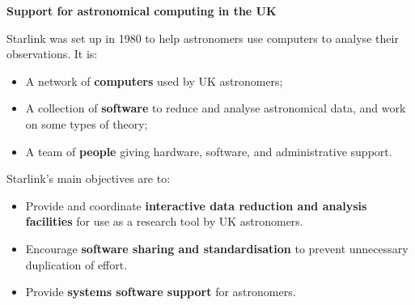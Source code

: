 \documentclass[twoside,11pt]{article}
\newenvironment{latexonly}{}{}
\newcommand{\html}[1]{}
\newcommand{\xlabel}[1]{}
\renewcommand{\thepage}{\roman{page}}
\begin{document}
\renewcommand{\thepage}{\arabic{page}}
\setcounter{page}{1}

\html{\section{\xlabel{support}Support for astronomical computing in
the UK}}
\begin{latexonly}
\begin{center}
{\large\bf Support for astronomical computing in the UK}
\end{center}
\end{latexonly}

\vspace*{5mm}
\html{\normalsize\rm}
Starlink was set up in 1980 to help astronomers use computers to analyse their
observations.
It is:

\begin{itemize}
\item A network of {\bf computers} used by UK astronomers;
\item A collection of {\bf software} to reduce and analyse astronomical data,
and work on some types of theory;
\item A team of {\bf people} giving hardware, software, and administrative
support.
\end{itemize}

Starlink's main objectives are to:

\begin{itemize}
\item Provide and coordinate
{\bf interactive data reduction and analysis facilities} for use as a
research tool by UK astronomers.
\item Encourage {\bf software sharing and standardisation} to prevent
unnecessary duplication of effort.
\item Provide {\bf systems software support} for astronomers.
\end{itemize}
\end{document}
